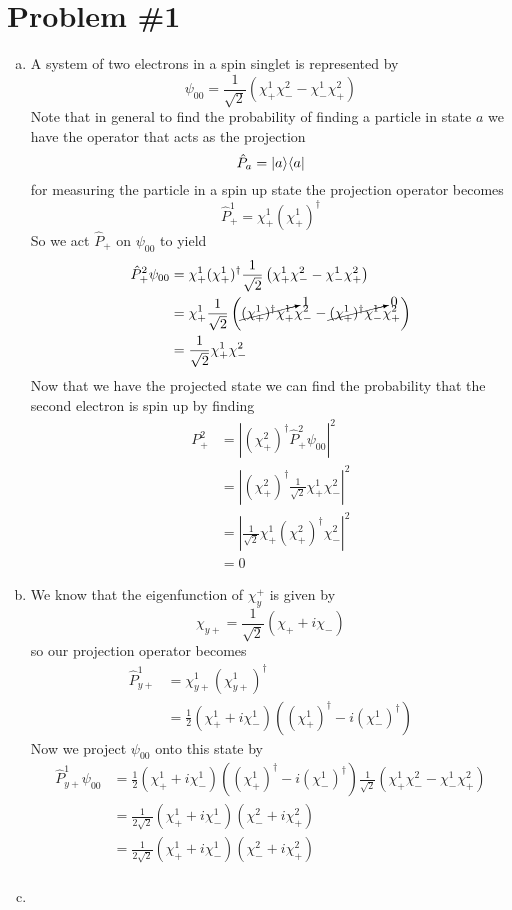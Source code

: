 \documentclass[11pt]{article}
\numberwithin{equation}{section}
\begin{document}


\section{Problem \#1}
\begin{enumerate}[(a)]
\item
A system of two electrons in a spin singlet is represented by
$$\psi_{00} = \frac{1}{\sqrt{2}}\left(\chi_{+}^{1}\chi_{-}^{2} - \chi_{-}^{1}\chi_{+}^{2}\right)$$
Note that in general to find the probability of finding a particle in state $a$ we have the operator that acts as the projection
$$\hat{P}_a = |{a}\rangle\langle{a}|$$
for measuring the particle in a spin up state the projection operator becomes
$$\hat{P}_{+}^1 = \chi_+^1(\chi_+^1)^{\dagger}$$
So we act $\hat{P}_+$ on $\psi_{00}$ to yield
\begin{align*}
\hat{P}_+^2\psi_{00} &= \chi_+^1(\chi_+^1)^{\dagger}\frac{1}{\sqrt{2}}\left(\chi_{+}^{1}\chi_{-}^{2} - \chi_{-}^{1}\chi_{+}^{2}\right)\\
&= \chi_+^1\frac{1}{\sqrt{2}}\left(\cancelto{1}{(\chi_+^1)^{\dagger}\chi_{+}^{1}}\chi_{-}^{2} - \cancelto{0}{(\chi_+^1)^{\dagger}\chi_{-}^{1}}\chi_{+}^{2}\right)\\
&= \frac{1}{\sqrt{2}}\chi_+^1\chi_{-}^{2}
\end{align*}
Now that we have the projected state we can find the probability that the second electron is spin up by finding
\begin{align*}
P_+^2 &= |(\chi_{+}^2)^{\dagger}\hat{P}_+^2\psi_{00}|^2\\
&= |(\chi_{+}^2)^{\dagger}\frac{1}{\sqrt{2}}\chi_+^1\chi_{-}^{2}|^2\\
&= |\frac{1}{\sqrt{2}}\chi_+^1(\chi_{+}^2)^{\dagger}\chi_{-}^{2}|^2\\
&= 0
\end{align*}

\item
We know that the eigenfunction of $\chi_y^{+}$ is given by
$$\chi_{y+} = \frac{1}{\sqrt{2}}\left(\chi_{+}+i\chi_{-}\right)$$
so our projection operator becomes
\begin{align*}
\hat{P}_{y+}^1 &= \chi_{y+}^1(\chi_{y+}^1)^{\dagger}\\
&= \frac{1}{2}(\chi_{+}^1+i\chi_{-}^1)((\chi_{+}^1)^{\dagger}-i(\chi_{-}^1)^{\dagger})
\end{align*}
Now we project $\psi_{00}$ onto this state by
\begin{align*}
\hat{P}_{y+}^{1}\psi_{00} &= \frac{1}{2}(\chi_{+}^1+i\chi_{-}^1)((\chi_{+}^1)^{\dagger}-i(\chi_{-}^1)^{\dagger})\frac{1}{\sqrt{2}}\left(\chi_{+}^{1}\chi_{-}^{2} - \chi_{-}^{1}\chi_{+}^{2}\right)\\
&= \frac{1}{2\sqrt{2}}(\chi_{+}^1+i\chi_{-}^1)\left(\chi_{-}^{2} + i\chi_{+}^{2}\right)\\
&= \frac{1}{2\sqrt{2}}(\chi_{+}^1+i\chi_{-}^1)\left(\chi_{-}^{2} + i\chi_{+}^{2}\right)\\
\end{align*}

\item
\end{enumerate}
\end{document}
